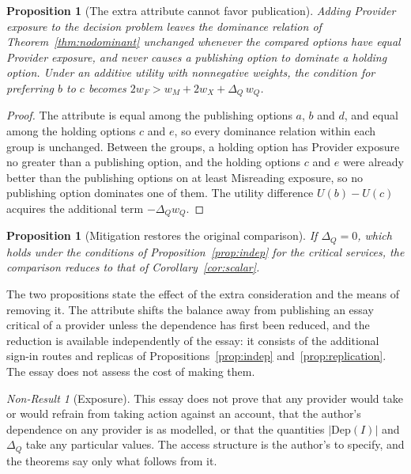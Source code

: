 \documentclass[11pt]{article}
\theoremstyle{plain}
\newtheorem{proposition}[theorem]{Proposition}
\theoremstyle{definition}
\theoremstyle{remark}
\newtheorem{nonresult}[theorem]{Non-Result}
\begin{document}
\begin{proposition}[The extra attribute cannot favor publication]\label{prop:extra}
Adding Provider exposure to the decision problem leaves the dominance relation of Theorem~\ref{thm:nodominant} unchanged whenever the compared options have equal Provider exposure, and never causes a publishing option to dominate a holding option. Under an additive utility with nonnegative weights, the condition for preferring $b$ to $c$ becomes $2w_F>w_M+2w_X+\Delta_Q\,w_Q$.
\end{proposition}

\begin{proof}
The attribute is equal among the publishing options $a$, $b$ and $d$, and equal among the holding options $c$ and $e$, so every dominance relation within each group is unchanged. Between the groups, a holding option has Provider exposure no greater than a publishing option, and the holding options $c$ and $e$ were already better than the publishing options on at least Misreading exposure, so no publishing option dominates one of them. The utility difference $U(b)-U(c)$ acquires the additional term $-\Delta_Q w_Q$. \qedhere
\end{proof}

\begin{proposition}[Mitigation restores the original comparison]\label{prop:mitigate}
If $\Delta_Q=0$, which holds under the conditions of Proposition~\ref{prop:indep} for the critical services, the comparison reduces to that of Corollary~\ref{cor:scalar}.
\end{proposition}

The two propositions state the effect of the extra consideration and the means of removing it. The attribute shifts the balance away from publishing an essay critical of a provider unless the dependence has first been reduced, and the reduction is available independently of the essay: it consists of the additional sign-in routes and replicas of Propositions~\ref{prop:indep} and~\ref{prop:replication}. The essay does not assess the cost of making them.

\begin{nonresult}[Exposure]\label{nr:exposure}
This essay does not prove that any provider would take or would refrain from taking action against an account, that the author's dependence on any provider is as modelled, or that the quantities $|\mathrm{Dep}(I)|$ and $\Delta_Q$ take any particular values. The access structure is the author's to specify, and the theorems say only what follows from it.
\end{nonresult}
\end{document}
